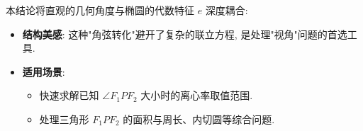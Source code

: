 \begin{explanationbox}
本结论将直观的几何角度与椭圆的代数特征 $e$ 深度耦合:
\begin{itemize}
    \item \textbf{结构美感}: 这种"角弦转化"避开了复杂的联立方程, 是处理"视角"问题的首选工具.
    \item \textbf{适用场景}:
    \begin{itemize}
        \item 快速求解已知 $\angle F_1PF_2$ 大小时的离心率取值范围.
        \item 处理三角形 $F_1PF_2$ 的面积与周长、内切圆等综合问题.
    \end{itemize}
\end{itemize}
\end{explanationbox}
